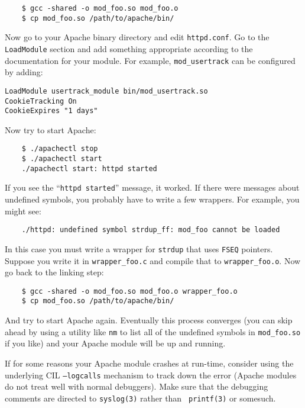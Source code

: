 \documentclass{book}
\begin{document}
\begin{verbatim}
    $ gcc -shared -o mod_foo.so mod_foo.o
    $ cp mod_foo.so /path/to/apache/bin/
\end{verbatim}

Now go to your Apache binary directory and edit {\tt httpd.conf}. Go to the
{\tt LoadModule} section and add something appropriate according to the
documentation for your module. For example, {\tt mod\_usertrack} can be
configured by adding:

\begin{verbatim}
LoadModule usertrack_module bin/mod_usertrack.so
CookieTracking On
CookieExpires "1 days"
\end{verbatim}

Now try to start Apache:

\begin{verbatim}
    $ ./apachectl stop
    $ ./apachectl start
    ./apachectl start: httpd started
\end{verbatim}

If you see the ``{\tt httpd started}'' message, it worked. If there were
messages about undefined symbols, you probably have to write a few
wrappers. For example, you might see:

\begin{verbatim}
    ./httpd: undefined symbol strdup_ff: mod_foo cannot be loaded
\end{verbatim}

In this case you must write a wrapper for {\tt strdup} that uses {\tt FSEQ}
pointers. Suppose you write it in {\tt wrapper\_foo.c} and compile that to
{\tt wrapper\_foo.o}. Now go back to the linking step: 

\begin{verbatim}
    $ gcc -shared -o mod_foo.so mod_foo.o wrapper_foo.o
    $ cp mod_foo.so /path/to/apache/bin/
\end{verbatim}

And try to start Apache again. Eventually this process converges (you can
skip ahead by using a utility like {\tt nm} to list all of the undefined
symbols in {\tt mod\_foo.so} if you like) and your Apache module will be up
and running.

If for some reasons your Apache module crashes at run-time, consider using
the underlying CIL {\tt --logcalls} mechanism to track down the error
(Apache modules do not treat well with normal debuggers). Make sure that
the debugging comments are directed to {\tt syslog(3)} rather than {\tt
printf(3)} or somesuch. 
\end{document}
